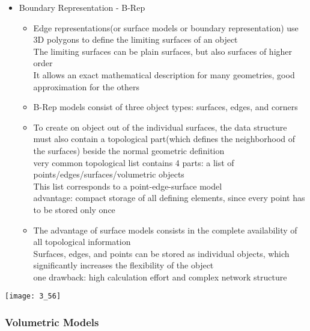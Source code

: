 \documentclass{standalone}
\begin{document}
\begin{itemize}
	\item Boundary Representation - B-Rep
	\begin{itemize}
		\item Edge representations(or surface models or boundary representation) use 3D polygons to define the limiting surfaces of an object \\
		The limiting surfaces can be plain surfaces, but also surfaces of higher order \\
		It allows an exact mathematical description for many geometries, good approximation for the others
		\item B-Rep models consist of three object types: surfaces, edges, and corners
		\item To create on object out of the individual surfaces, the data structure must also contain a topological part(which defines the neighborhood of the surfaces) beside the normal geometric definition \\
		very common topological list contains 4 parts: a list of points/edges/surfaces/volumetric objects \\
		This list corresponds to a point-edge-surface model \\
		advantage: compact storage of all defining elements, since every point has to be stored only once
		\item The advantage of surface models consists in the complete availability of all topological information \\
		Surfaces, edges, and points can be stored as individual objects, which significantly increases the flexibility of the object \\
		one drawback: high calculation effort and complex network structure
	\end{itemize}
\end{itemize}

\texttt{[image: 3\_56]}

\subsubsection*{Volumetric Models}
\end{document}
